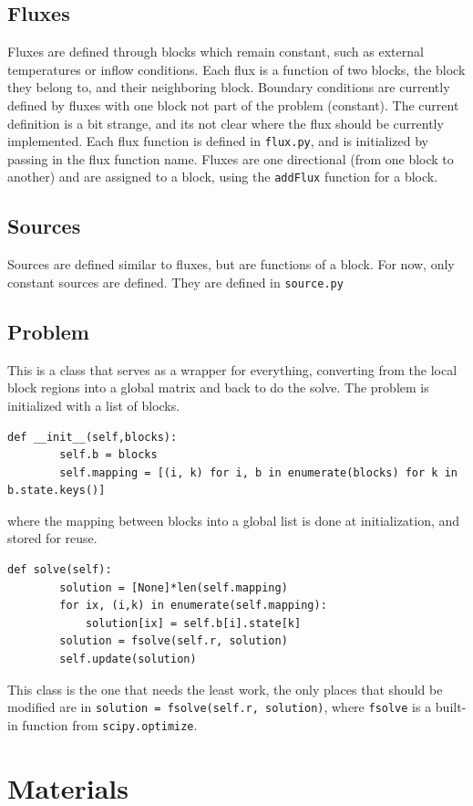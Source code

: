 \documentclass[11pt]{article}
\begin{document}
\subsection{Fluxes}
Fluxes are defined through blocks which remain constant, such as external temperatures or inflow conditions. Each flux is a function of two blocks, the block they belong to, and their neighboring block. Boundary conditions are currently defined by fluxes with one block not part of the problem (constant). The current definition is a bit strange, and its not clear where the flux should be currently implemented. Each flux function is defined in \lstinline{flux.py}, and is initialized by passing in the flux function name. Fluxes are one directional (from one block to another) and are assigned to a block, using the \lstinline{addFlux} function for a block. 
\subsection{Sources}
Sources are defined similar to fluxes, but are functions of a block. For now, only constant sources are defined. They are defined in \lstinline{source.py}
\subsection{Problem}
This is a class that serves as a wrapper for everything, converting from the local block regions into a global matrix and back to do the solve. The problem is initialized with a list of blocks.
\begin{lstlisting}
def __init__(self,blocks):
		self.b = blocks
		self.mapping = [(i, k) for i, b in enumerate(blocks) for k in b.state.keys()]
\end{lstlisting}
where the mapping between blocks into a global list is done at initialization, and stored for reuse. 
\begin{lstlisting}
def solve(self):
		solution = [None]*len(self.mapping)
		for ix, (i,k) in enumerate(self.mapping):
			solution[ix] = self.b[i].state[k]
		solution = fsolve(self.r, solution)
		self.update(solution)
\end{lstlisting}
This class is the one that needs the least work, the only places that should be modified are in \lstinline{solution = fsolve(self.r, solution)}, where \lstinline{fsolve} is a built-in function from \lstinline{scipy.optimize}.
\section{Materials}
\end{document}
